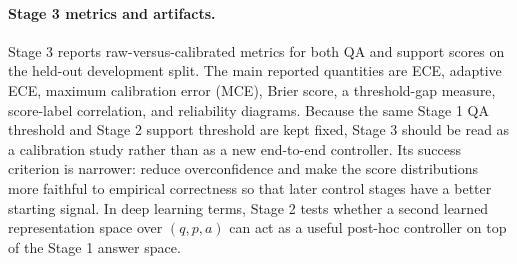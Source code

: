 \paragraph{Stage 3 metrics and artifacts.}
Stage 3 reports raw-versus-calibrated metrics for both QA and support scores on
the held-out development split.
The main reported quantities are ECE, adaptive ECE, maximum calibration error
(MCE), Brier score, a threshold-gap measure, score-label correlation, and
reliability diagrams.
Because the same Stage 1 QA threshold and Stage 2 support threshold are kept
fixed, Stage 3 should be read as a calibration study rather than as a new
end-to-end controller.
Its success criterion is narrower:
reduce overconfidence and make the score distributions more faithful to
empirical correctness so that later control stages have a better starting
signal.
In deep learning terms, Stage 2 tests whether a second learned representation
space over \((q, p, a)\) can act as a useful post-hoc controller on top of the
Stage 1 answer space.
